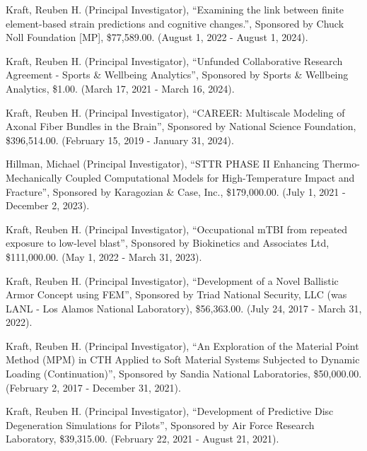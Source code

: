 \documentclass[a4paper,10pt]{article}
\begin{document}
        \noindent Kraft, Reuben H. (Principal Investigator), ``Examining the link between finite element-based strain predictions and cognitive changes.'', Sponsored by Chuck Noll Foundation [MP], \$77,589.00. (August 1, 2022 - August 1, 2024).\vspace{0.25cm}
        
        \noindent Kraft, Reuben H. (Principal Investigator), ``Unfunded Collaborative Research Agreement - Sports \& Wellbeing Analytics'', Sponsored by Sports \& Wellbeing Analytics, \$1.00. (March 17, 2021 - March 16, 2024).\vspace{0.25cm}
        
        \noindent Kraft, Reuben H. (Principal Investigator), ``CAREER: Multiscale Modeling of Axonal Fiber Bundles in the Brain'', Sponsored by National Science Foundation, \$396,514.00. (February 15, 2019 - January 31, 2024).\vspace{0.25cm}
        
        \noindent Hillman, Michael (Principal Investigator), ``STTR PHASE II Enhancing Thermo-Mechanically Coupled Computational Models for High-Temperature Impact and Fracture'', Sponsored by Karagozian \& Case, Inc., \$179,000.00. (July 1, 2021 - December 2, 2023).\vspace{0.25cm}
        
        \noindent Kraft, Reuben H. (Principal Investigator), ``Occupational mTBI from repeated exposure to low-level blast'', Sponsored by Biokinetics and Associates Ltd, \$111,000.00. (May 1, 2022 - March 31, 2023).\vspace{0.25cm}
        
        \noindent Kraft, Reuben H. (Principal Investigator), ``Development of a Novel Ballistic Armor Concept using FEM'', Sponsored by Triad National Security, LLC (was LANL - Los Alamos National Laboratory), \$56,363.00. (July 24, 2017 - March 31, 2022).\vspace{0.25cm}
        
        \noindent Kraft, Reuben H. (Principal Investigator), ``An Exploration of the Material Point Method (MPM) in CTH Applied to Soft Material Systems Subjected to Dynamic Loading (Continuation)'', Sponsored by Sandia National Laboratories, \$50,000.00. (February 2, 2017 - December 31, 2021).\vspace{0.25cm}
        
        \noindent Kraft, Reuben H. (Principal Investigator), ``Development of Predictive Disc Degeneration Simulations for Pilots'', Sponsored by Air Force Research Laboratory, \$39,315.00. (February 22, 2021 - August 21, 2021).\vspace{0.25cm}
        
\end{document}

